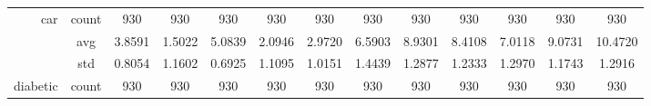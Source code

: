 \begin{table}[htbp]
{\begin{tabular}{rcccccccccccc}
                  car                                & count                                  & 930                                                                                & 930                                                                       & 930                                                                       & 930                                                                       & 930                                           & 930                                         & 930                                            & 930                                            & 930                                            & 930                                            & 930                                            \\
                                                     & avg                                    & 3.8591                                                                             & \cellcolor[rgb]{ .776,  .937,  .808}\textcolor[rgb]{ 0,  .38,  0}{1.5022} & 5.0839                                                                    & 2.0946                                                                    & 2.9720                                        & 6.5903                                      & 8.9301                                         & 8.4108                                         & 7.0118                                         & 9.0731                                         & 10.4720                                        \\
                                                     & std                                    & 0.8054                                                                             & 1.1602                                                                    & 0.6925                                                                    & 1.1095                                                                    & 1.0151                                        & 1.4439                                      & 1.2877                                         & 1.2333                                         & 1.2970                                         & 1.1743                                         & 1.2916                                         \\
                  diabetic                           & count                                  & 930                                                                                & 930                                                                       & 930                                                                       & 930                                                                       & 930                                           & 930                                         & 930                                            & 930                                            & 930                                            & 930                                            & 930                                            \\

\end{tabular}}
\end{table}
